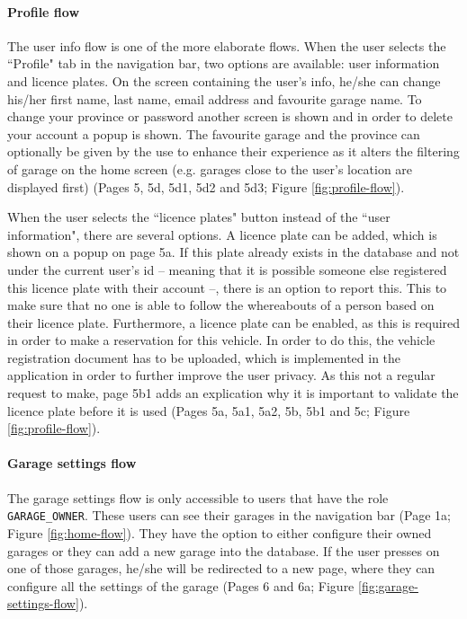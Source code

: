 \paragraph{Profile flow}\label{sec:profile-flow}
The user info flow is one of the more elaborate flows. When the user selects the ``Profile" tab in the navigation bar, two options are available: user information and licence plates. On the screen containing the user's info, he/she can change his/her first name, last name, email address and favourite garage name. To change your province or password another screen is shown and in order to delete your account a popup is shown. The favourite garage and the province can optionally be given by the use to enhance their experience as it alters the filtering of garage on the home screen (e.g. garages close to the user's location are displayed first) (Pages 5, 5d, 5d1, 5d2 and 5d3; Figure \ref{fig:profile-flow}).

\ind When the user selects the ``licence plates" button instead of the ``user information", there are several options. A licence plate can be added, which is shown on a popup on page 5a. If this plate already exists in the database and not under the current user's id -- meaning that it is possible someone else registered this licence plate with their account --, there is an option to report this. This to make sure that no one is able to follow the whereabouts of a person based on their licence plate. Furthermore, a licence plate can be enabled, as this is required in order to make a reservation for this vehicle. In order to do this, the vehicle registration document has to be uploaded, which is implemented in the application in order to further improve the user privacy. As this not a regular request to make, page 5b1 adds an explication why it is important to validate the licence plate before it is used (Pages 5a, 5a1, 5a2, 5b, 5b1 and 5c; Figure \ref{fig:profile-flow}).

\paragraph{Garage settings flow}
The garage settings flow is only accessible to users that have the role \verb+GARAGE_OWNER+. These users can see their garages in the navigation bar (Page 1a; Figure \ref{fig:home-flow}). They have the option to either configure their owned garages or they can add a new garage into the database. If the user presses on one of those garages, he/she will be redirected to a new page, where they can configure all the settings of the garage (Pages 6 and 6a; Figure \ref{fig:garage-settings-flow}).

